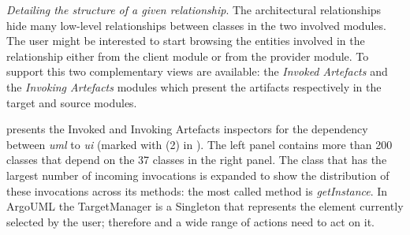 \documentclass[preprint,12pt]{elsarticle}
\newcommand{\cd}[1]{{\em{#1}}}
\begin{document}
\begin{description}

\item {\em Detailing the structure of a given relationship}. The architectural relationships hide many low-level relationships between classes in the two involved modules. The user might be interested to start browsing the entities involved in the relationship either from the client module or from the provider module. To support this two complementary views are available: the {\em Invoked Artefacts} and the {\em Invoking Artefacts} modules which present the artifacts respectively in the target and source modules. 


 presents the Invoked and Invoking Artefacts inspectors for the dependency between \cd{uml} to \cd{ui} (marked with (2) in ). The left panel contains more than 200 classes that depend on the 37 classes in the right panel. The class that has the largest number of incoming invocations is expanded to show the distribution of these invocations across its methods: the most called method is \cd{getInstance}. In ArgoUML the TargetManager is a Singleton that represents the element currently selected by the user; therefore and a wide range of actions need to act on it.







\end{description}
\end{document}
